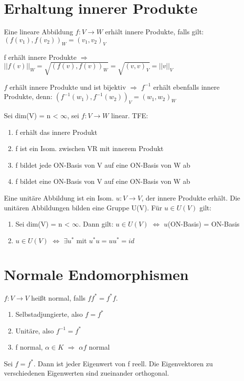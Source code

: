 \section{Erhaltung innerer Produkte}
\begin{theorem}
\leavevmode
\begin{compactitem}
\item Eine lineare Abbildung $f: V \to W$ erhält innere Produkte, falls gilt: $(f(v_1), f(v_2))_W = (v_1, v_2)_V$
\item f erhält innere Produkte $\Rightarrow$ $||f(v)||_W = \sqrt{(f(v), f(v))_W} = \sqrt{(v,v)_V} = ||v||_V$
\item $f$ erhält innere Produkte und ist bijektiv $\Rightarrow$ $f^{-1}$ erhält ebenfalls innere Produkte, denn: $(f^{-1}(w_1), f^{-1}(w_2))_V = (w_1, w_2)_W$
\item Sei dim(V) = n < $\infty$, sei $f: V \to W$ linear. TFE:
\begin{enumerate}
\item f erhält das innere Produkt
\item f ist ein Isom. zwischen VR mit innerem Produkt
\item f bildet jede ON-Basis von V auf eine ON-Basis von W ab
\item f bildet eine ON-Basis von V auf eine ON-Basis von W ab
\end{enumerate}
Eine unitäre Abbildung ist ein Isom. $u: V \to V$, der innere Produkte erhält.
Die unitären Abbildungen bilden eine Gruppe U(V). Für $u \in U(V)$ gilt:
\begin{enumerate}
\item Sei dim(V) = n < $\infty$. Dann gilt: $u \in U(V)$ $\Leftrightarrow$ $u$(ON-Basis) = ON-Basis
\item $u \in U(V)$ $\Leftrightarrow$ $\exists u^*$ mit $u^*u=uu^*=id$
\end{enumerate}
\end{compactitem}
\end{theorem}

\section{Normale Endomorphismen}
\begin{definition}
$f: V \to V$ heißt normal, falls $ff^*=f^*f$.
\end{definition}

\begin{example}
\leavevmode
\begin{enumerate}
\item Selbstadjungierte, also $f = f^*$
\item Unitäre, also $f^{-1} = f^*$
\item f normal, $\alpha \in K$ $\Rightarrow$ $\alpha f$ normal
\end{enumerate}
\end{example}
\begin{lemma}
Sei $f = f^*$. Dann ist jeder Eigenwert von f reell. Die Eigenvektoren zu verschiedenen Eigenwerten sind zueinander orthogonal.
\end{lemma}


